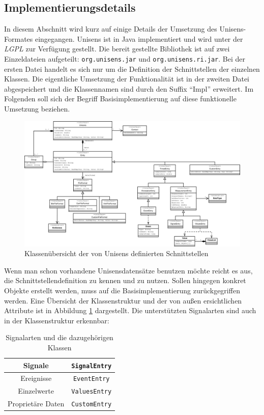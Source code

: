 \subsection{Implementierungsdetails}

In diesem Abschnitt wird kurz auf einige Details der Umsetzung des Unisens-Formates eingegangen.
Unisens ist in Java implementiert und wird unter der \emph{\ac{LGPL}} zur Verf\"ugung gestellt.
Die bereit gestellte Bibliothek ist auf zwei Einzeldateien aufgeteilt: \verb|org.unisens.jar| und \verb|org.unisens.ri.jar|.
Bei der ersten Datei handelt es sich nur um die Definition der Schnittstellen der einzelnen Klassen.
Die eigentliche Umsetzung der Funktionalit\"at ist in der zweiten Datei abgespeichert und die Klassennamen sind durch den Suffix "`Impl"' erweitert.
Im Folgenden soll sich der Begriff Basisimplementierung auf diese funktionelle Umsetzung beziehen.
\begin{figure}
\includegraphics[width=\textwidth]{bilder/unisens_interface_.eps}
\caption{Klassen\"ubersicht der von Unisens definierten Schnittstellen}
\label{pic:unisens_interface}
\end{figure}
Wenn man schon vorhandene Unisensdatens\"atze benutzen m\"ochte reicht es aus, die Schnittstellendefinition zu kennen und zu nutzen.
Sollen hingegen konkret Objekte erstellt werden, muss auf die Basisimplementierung zur\"uckgegriffen werden.
Eine \"Ubersicht der Klassenstruktur und der von au\ss en ersichtlichen Attribute ist in Abbildung \ref{pic:unisens_interface} dargestellt.
Die unterst\"utzten Signalarten sind auch in der Klassenstruktur erkennbar:
\begin{table}[h]
\centering
\begin{tabular}{|c|c|}
	\hline Signale & \verb|SignalEntry| \\
	\hline Ereignisse & \verb|EventEntry| \\
	\hline Einzelwerte & \verb|ValuesEntry| \\
	\hline Propriet\"are Daten & \verb|CustomEntry| \\
	\hline
\end{tabular}
\caption{Signalarten und die dazugeh\"origen Klassen}
\label{tab:signal_klassen}
\end{table}

